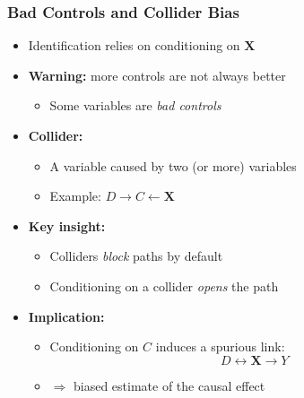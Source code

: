 \documentclass[12pt, compress]{beamer}
\begin{document}
\begin{frame}
	\frametitle{Bad Controls and Collider Bias}

\begin{itemize}
	\item Identification relies on conditioning on $\mathbf{X}$
	
	\medskip
	
	\item \textbf{Warning:} more controls are not always better
	\begin{itemize}
		\item Some variables are \textit{bad controls} \citep{angrist2009mostly}
	\end{itemize}
	
	\medskip
	
	\item \textbf{Collider:}
	\begin{itemize}
		\item A variable caused by two (or more) variables
		\item Example: $D \to C \leftarrow \mathbf{X}$
	\end{itemize}
	
	\medskip
	
	\item \textbf{Key insight:}
	\begin{itemize}
		\item Colliders \textit{block} paths by default
		\item Conditioning on a collider \textit{opens} the path
	\end{itemize}
	
	\medskip
	
	\item \textbf{Implication:}
	\begin{itemize}
		\item Conditioning on $C$ induces a spurious link:
		\[
		D \leftrightarrow \mathbf{X} \rightarrow Y
		\]
		\item $\Rightarrow$ biased estimate of the causal effect
	\end{itemize}

\end{itemize}

\end{frame}
\end{document}
